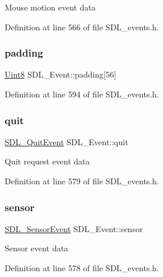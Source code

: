Mouse motion event data 

Definition at line 566 of file S\+D\+L\+\_\+events.\+h.

\mbox{\label{union_s_d_l___event_aabb599570edfa54aad6255c1f24f2ad2}} 
\subsubsection{\texorpdfstring{padding}{padding}}
{\footnotesize\ttfamily \mbox{\hyperlink{_s_d_l__stdinc_8h_a2944638813a090aa23e62f4da842c3e2}{Uint8}} S\+D\+L\+\_\+\+Event\+::padding\mbox{[}56\mbox{]}}



Definition at line 594 of file S\+D\+L\+\_\+events.\+h.

\mbox{\label{union_s_d_l___event_a102a3008afe67a1c02ae7504e232dcef}} 
\subsubsection{\texorpdfstring{quit}{quit}}
{\footnotesize\ttfamily \mbox{\hyperlink{struct_s_d_l___quit_event}{S\+D\+L\+\_\+\+Quit\+Event}} S\+D\+L\+\_\+\+Event\+::quit}

Quit request event data 

Definition at line 579 of file S\+D\+L\+\_\+events.\+h.

\mbox{\label{union_s_d_l___event_af0da8e4a59228360984595125062eb2f}} 
\subsubsection{\texorpdfstring{sensor}{sensor}}
{\footnotesize\ttfamily \mbox{\hyperlink{struct_s_d_l___sensor_event}{S\+D\+L\+\_\+\+Sensor\+Event}} S\+D\+L\+\_\+\+Event\+::sensor}

Sensor event data 

Definition at line 578 of file S\+D\+L\+\_\+events.\+h.

\mbox{\label{union_s_d_l___event_ab3b2eaf5348d4c50a51b1f297fdef537}} 

